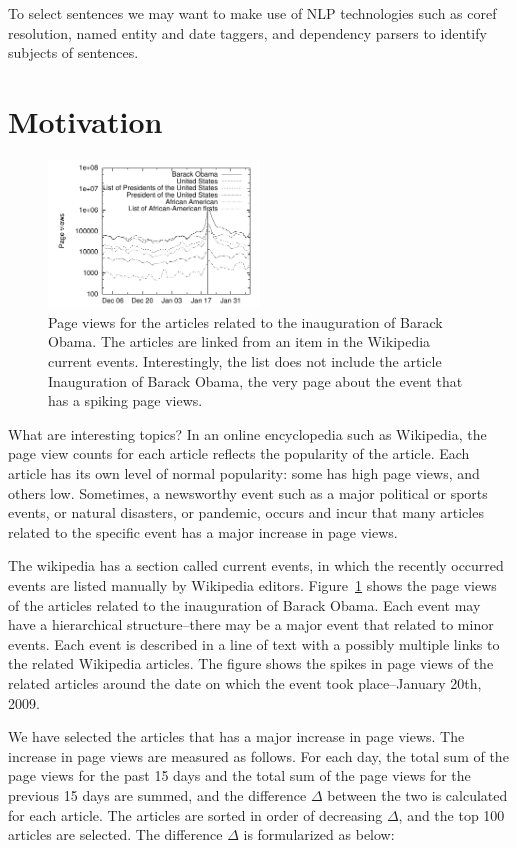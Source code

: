 \documentclass[11pt]{article}
\newcommand{\war}[1]{{\sf\small #1}}
\begin{document}
To select sentences we may want to make use of NLP technologies such as coref resolution, named entity and date taggers, and dependency parsers to identify subjects of sentences.

\section{Motivation}

\begin{figure}
\centering
\includegraphics[width=0.5\textwidth]{figures/obama.pdf}
\caption{Page views for the articles related to the inauguration of Barack Obama. The articles are linked from an item in the Wikipedia current events. Interestingly, the list does not include the article \war{Inauguration of Barack Obama}, the very page about the event that has a spiking page views.}
\label{fig:obama-sparkline}
\end{figure}

What are interesting topics? In an online encyclopedia such as Wikipedia, the page view counts for each article reflects the popularity of the article. Each article has its own level of normal popularity: some has high page views, and others low. Sometimes, a newsworthy event such as a major political or sports events, or natural disasters, or pandemic, occurs and incur that many articles related to the specific event has a major increase in page views.

The wikipedia has a section called current events, in which the recently occurred events are listed manually by Wikipedia editors. Figure~\ref{fig:obama-sparkline} shows the page views of the articles related to the inauguration of Barack Obama. Each event may have a hierarchical structure--there may be a major event that related to minor events. Each event is described in a line of text with a possibly multiple links to the related Wikipedia articles. The figure shows the spikes in page views of the related articles around the date on which the event took place--January 20th, 2009.

We have selected the articles that has a major increase in page views. The increase in page views are measured as follows. For each day, the total sum of the page views for the past 15 days and the total sum of the page views for the previous 15 days are summed, and the difference $\Delta$ between the two is calculated for each article. The articles are sorted in order of decreasing $\Delta$, and the top 100 articles are selected. The difference $\Delta$ is formularized as below:
\end{document}
